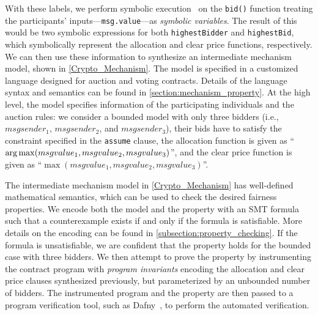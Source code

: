With these labels, we perform symbolic execution~\cite{king1976symbolic} on the \texttt{bid()}
function treating the participants' inputs---\texttt{msg.value}---as \emph{symbolic variables}.
The result of this would be two symbolic expressions for both \texttt{highestBidder} and
\texttt{highestBid}, which symbolically represent the allocation and clear price functions,
respectively.
We can then use these information to synthesize an intermediate mechanism model, shown in
\cref{Crypto_Mechanism}.
The model is specified in a customized language designed for auction and voting contracts.
Details of the language syntax and semantics can be found in \cref{section:mechanism_property}.
At the high level, the model specifies information of the participating individuals and the auction
rules: we consider a bounded model with only three bidders (i.e., $msgsender_1$, $msgsender_2$, and
$msgsender_3$), their bids have to satisfy the constraint specified in the \texttt{assume} clause,
the allocation function is given as ``$\operatorname*{arg\,max}(msgvalue_1,\allowbreak msgvalue_2,\allowbreak
msgvalue_3)$'', and the clear price function is given as ``$\max(msgvalue_1,\allowbreak
msgvalue_2,\allowbreak msgvalue_3)$''.


The intermediate mechanism model in \cref{Crypto_Mechanism} has well-defined mathematical
semantics, which can be used to check the desired fairness properties.
We encode both the model and the property with an SMT formula such that a counterexample exists if
and only if the formula is satisfiable.
More details on the encoding can be found in \cref{subsection:property_checking}.
If the formula is unsatisfiable, we are confident that the property holds for the bounded case with
three bidders.
We then attempt to prove the property by instrumenting the contract program with \emph{program
invariants} encoding the allocation and clear price clauses synthesized previously, but
parameterized by an unbounded number of bidders.
The instrumented program and the property are then passed to a program verification tool, such as
Dafny~\cite{dafny}, to perform the automated verification.

